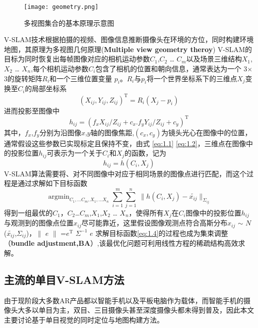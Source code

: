 \begin{figure}[!htbp]
\centering
\texttt{[image: geometry.png]}
\caption{多视图集合的基本原理示意图}
\label{fig:MVGeometry}
\end{figure}
V-SLAM技术根据拍摄的视频、图像信息推断摄像头在环境的方位，同时构建环境地图，其原理为多视图几何原理(\textbf{Multiple view geometry theroy}\cite{Hartley2004}) V-SLAM的目标为同时恢复出每帧图像对应的相机运动参数$C_1$,$C_2$ … $C_m$以及场景三维结构$X_1$,$X_2$ … $X_n$,每个相机运动参数$C_i$包含了相机的位置和朝向信息，通常表达为一个 3$\times$3的旋转矩阵$R_i$和一个三维位置变量 $p_i$。$R_i$与$p_i$将一个世界坐标系下的三维点$X_j$变换至$C_i$的局部坐标系
\begin{equation}\label{eq:1.1}
{(X_{ij},Y_{ij},Z_{ij})}^\mathrm{T}=R_{i}(X_{j}-p_{i})
\end{equation}
进而投影至图像中
\begin{equation}\label{eq:1.2}
h_{ij}={(f_{x}X_{ij}/Z_{ij}+c_{x}.f_{y}Y_{ij}/Z_{ij}+c_{y})}^\mathrm{T}
\end{equation}
其中，$f_x$,$f_y$分别为沿图像$x$,$y$轴的图像焦距,$(c_x,c_y)$为镜头光心在图像中的位置，通常假设这些参数已实现标定且保持不变，由式
\autoref{eq:1.1} \autoref{eq:1.2}，三维点在图像中的投影位置$h_{ij}$可表示为一个关于$C_i$和$X_j$的函数，记为
\begin{equation}\label{eq:1.3}
h_{ij}=h(C_i,X_j)
\end{equation}
V-SLAM算法需要将、对不同图像中对应于相同场景的图像点进行匹配，而这个过程是通过求解如下目标函数
\begin{equation}\label{eq:1.4}
\mathop{\arg\min}_{C_1,…C_m,X_1,…X_n} \sum_{i=1}^{m} {\sum_{j=1}^{n} \ \| {h} (C_i,X_j)-\tilde{x_{ij}}\|_{\Sigma_{ij}}}
\end{equation}
得到一组最优的$C_1$，$C_2$…$C_m$,$X_1$,$X_2$ … $X_n$，使得所有$X_j$在$C_i$图像中的投影位置$h_{ij}$与观测到的图像点位置$x_{ij}$尽可能靠近，这里假设图像观测点符合高斯分布$x_{ij}$ $\sim$ $\mathrm{\textit{N}}$ ($\tilde{x_{ij}}$,$\Sigma_{ij}$)，$\|$ $e$ $\|$ =$e^{\mathrm{T}}$ $\Sigma^{-1}$ $e$
求解目标函数\autoref{eq:1.4}的过程也成为集束调整（\textbf{bundle adjustment,BA}）,该最优化问题可利用线性方程的稀疏结构高效求解。
\subsection{主流的单目V-SLAM方法}
由于现阶段大多数AR产品都以智能手机以及平板电脑作为载体，而智能手机的摄像头大多以单目为主，双目、三目摄像头甚至深度摄像头都未得到普及，因此本文主要讨论基于单目视觉的同时定位与地图构建方法。

